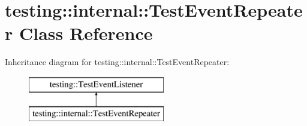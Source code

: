 \hypertarget{classtesting_1_1internal_1_1TestEventRepeater}{}\section{testing\+:\+:internal\+:\+:Test\+Event\+Repeater Class Reference}
\label{classtesting_1_1internal_1_1TestEventRepeater}
Inheritance diagram for testing\+:\+:internal\+:\+:Test\+Event\+Repeater\+:\begin{figure}[H]
\begin{center}
\leavevmode
\includegraphics[height=2.000000cm]{classtesting_1_1internal_1_1TestEventRepeater}
\end{center}
\end{figure}
